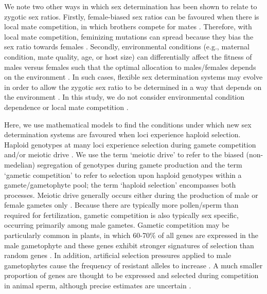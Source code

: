 \documentclass[12pt]{article}
\begin{document}
We note two other ways in which sex determination has been shown to relate to zygotic sex ratios.
Firstly, female-biased sex ratios can be favoured when there is local mate competition, in which brothers compete for mates \citep{Hamilton:1967ts}. 
Therefore, with local mate competition, feminizing mutations can spread because they bias the sex ratio towards females \citep{Wilson:1981vm,Vuillleumier:2007bh}. 
Secondly, environmental conditions (e.g., maternal condition, mate quality, age, or host size) can differentially affect the fitness of males versus females such that the optimal allocation to males/females depends on the environment \citep{Trivers:1973wb,Charnov:1977tx,Charnov:1982wg}. 
In such cases, flexible sex determination systems may evolve in order to allow the zygotic sex ratio to be determined in a way that depends on the environment \citep{Charnov:1977tx,Werren:1984tl,Pen:2010kk}. 
In this study, we do not consider environmental condition dependence or local mate competition \citep[reviewed in][]{Charnov:1982wg,Bull:1983vi,West:2009we}. 

Here, we use mathematical models to find the conditions under which new sex determination systems are favoured when loci experience haploid selection. 
Haploid genotypes at many loci experience selection during gamete competition and/or meiotic drive \citep{Mulcahy:1996ha,JOSEPH:2004haa}.
We use the term `meiotic drive' to refer to the biased (non-medelian) segregation of genotypes during gamete production and the term `gametic competition' to refer to selection upon haploid genotypes within a gamete/gametophyte pool; the term `haploid selection' encompasses both processes. 
Meiotic drive generally occurs either during the production of male or female gametes only \citep{Ubeda:2005gw,Lindholm:2016cw}.
Because there are typically more pollen/sperm than required for fertilization, gametic competition is also typically sex specific, occurring primarily among male gametes.
Gametic competition may be particularly common in plants, in which 60-70\% of all genes are expressed in the male gametophyte and these genes exhibit stronger signatures of selection than random genes \citep{Borg:2009jpa,Arunkumar:2013iq,Gossmann:2014dua}.
In addition, artificial selection pressures applied to male gametophytes cause the frequency of resistant alleles to increase \citep[e.g.,][]{Hormaza:1996cv,Ravikumar:2003uo,Hedhly:2004iv,Clarke:2004ir}. 
A much smaller proportion of genes are thought to be expressed and selected during competition in animal sperm, although precise estimates are uncertain \citep{Zheng:2001fi,JOSEPH:2004haa,Vibranovski:2010et}. 
\end{document}
